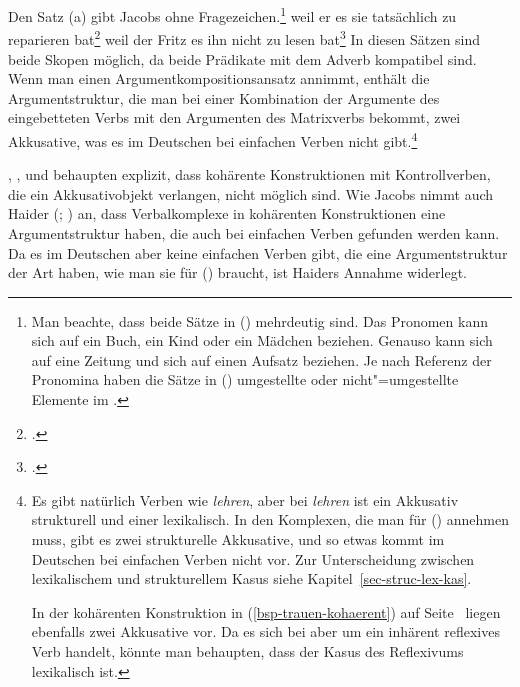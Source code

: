 Den Satz (a) gibt Jacobs ohne Fragezeichen.\footnote{%
\label{fn-scrambling-pronoun}%
        Man beachte, dass beide Sätze in () mehrdeutig sind.
        Das Pronomen  kann sich \zb auf ein Buch, ein Kind oder ein Mädchen beziehen.
        Genauso kann  sich auf eine Zeitung und  sich auf einen Aufsatz
        beziehen. Je nach Referenz der Pronomina haben die Sätze in ()
        umgestellte oder nicht"=umgestellte Elemente im \mf.%
}
\eal
\label{ex-coherent-bitten}
\ex
weil    er       es       sie       tatsächlich zu reparieren bat\label{bsp-er-es-sie-zu-reparieren-bat}\footnote{
        .
}
\ex{}
weil    der Fritz       es       ihn       nicht zu lesen bat\label{bsp-es-ihn-nicht-zu-lesen-bat}\footnote{
        .
}
\zl
In diesen Sätzen sind beide Skopen möglich, da beide Prädikate mit dem Adverb kompatibel sind.
Wenn man einen Argumentkompositionsansatz annimmt, enthält die Argumentstruktur, die man bei einer
Kombination der Argumente des eingebetteten Verbs mit den Argumenten des Matrixverbs bekommt,
zwei Akkusative, was es im Deutschen bei einfachen Verben nicht gibt.\footnote{
        Es gibt natürlich Verben wie \emph{lehren}, aber bei \emph{lehren} ist ein Akkusativ
        strukturell und einer lexikalisch. In den Komplexen, die man für () annehmen
        muss, gibt es zwei strukturelle Akkusative, und so etwas kommt im Deutschen bei einfachen
        Verben nicht vor. Zur Unterscheidung zwischen lexikalischem und strukturellem Kasus
        siehe Kapitel~\ref{sec-struc-lex-kas}.

        In der kohärenten Konstruktion in (\ref{bsp-trauen-kohaerent}) auf Seite~\pageref{bsp-trauen-kohaerent}
        liegen ebenfalls zwei Akkusative vor. Da es sich bei  aber um ein inhärent
        reflexives Verb handelt, könnte man behaupten, dass der Kasus
        des Reflexivums lexikalisch ist.%
}

\citet[]{BK89a}, \citet[]{Haider90b},
\citet[]{VS98a} und \citet[]{Abraham2005a}
behaupten explizit, dass kohärente Konstruktionen mit Kontrollverben, die ein Akkusativobjekt verlangen,
nicht möglich sind.
Wie Jacobs nimmt auch Haider (\citeyear[]{Haider86c}; \citeyear[]{Haider90b}) an,
dass Verbalkomplexe in kohärenten Konstruktionen eine Argumentstruktur haben, die auch bei
einfachen Verben gefunden werden kann. Da es im Deutschen aber keine einfachen Verben gibt,
die eine Argumentstruktur der Art haben, wie man sie für () braucht, ist Haiders Annahme
widerlegt.


